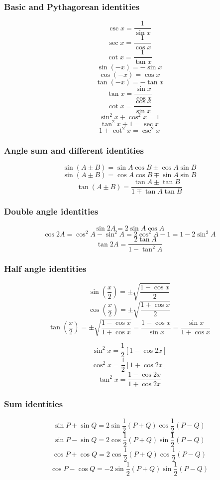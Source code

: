 \documentclass[11pt]{article}
\begin{document}
\subsubsection{Basic and Pythagorean identities}
\label{sec:org5ebc8cb}
\[\csc x = \frac{1}{\sin x}\]
\[\sec x = \frac{1}{\cos x}\]
\[\cot x = \frac{1}{\tan x}\]
\[\sin (-x) = - \sin x\]
\[\cos (-x) = \cos x\]
\[\tan (-x) = - \tan x\]
\[\tan x = \frac{\sin x}{\cos x}\]
\[\cot x = \frac{\cos x}{\sin x}\]
\[\sin^2 x + \cos^2 x = 1\]
\[\tan^2 x + 1 = \sec x\]
\[1 + \cot^2 x = \csc^2 x\]

\subsubsection{Angle sum and different identities}
\label{sec:org0efbfcd}
\[\sin(A \pm B) = \sin A \cos B \pm \cos A \sin B\]
\[\sin(A \pm B) = \cos A \cos B \mp \sin A \sin B\]
\[\tan(A \pm B) = \frac{\tan A \pm \tan B}{1 \mp \tan A \tan B}\]

\subsubsection{Double angle identities}
\label{sec:orga30fd65}
\[\sin 2A = 2 \sin A \cos A\]
\[\cos 2A = \cos^2 A - \sin^2 A = 2 \cos^2 A - 1 = 1 - 2 \sin^2 A\]
\[\tan 2A = \frac{2 \tan A}{1 - \tan^2 A}\]

\subsubsection{Half angle identities}
\label{sec:org8973bed}
\[\sin \left(\frac{x}{2} \right) = \pm \sqrt{\frac{1 - \cos x}{2}}\]
\[\cos \left(\frac{x}{2} \right) = \pm \sqrt{\frac{1 + \cos x}{2}}\]
\[\tan \left(\frac{x}{2} \right) = \pm \sqrt{\frac{1 - \cos x}{1 + \cos x}} = \frac{1 - \cos x}{\sin x} = \frac{\sin x}{1 + \cos x}\]

\[\sin^2 x = \frac{1}{2} \left[1 - \cos 2x \right]\]
\[\cos^2 x = \frac{1}{2} \left[1 + \cos 2x \right]\]
\[\tan^2 x = \frac{1 - \cos 2x}{1 + \cos 2x}\]

\subsubsection{Sum identities}
\label{sec:org776acd2}
\[\sin P + \sin Q = 2 \sin \frac{1}{2}(P + Q) \cos \frac{1}{2}(P - Q)\]
\[\sin P - \sin Q = 2 \cos \frac{1}{2}(P + Q) \sin \frac{1}{2}(P - Q)\]
\[\cos P + \cos Q = 2 \cos \frac{1}{2}(P + Q) \cos \frac{1}{2}(P - Q)\]
\[\cos P - \cos Q = - 2 \sin \frac{1}{2}(P + Q) \sin \frac{1}{2}(P - Q)\]
\end{document}

